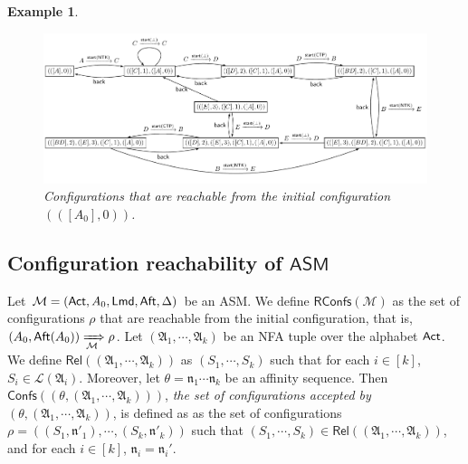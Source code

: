 \documentclass[preprint,12pt]{elsarticle}
\newtheorem{example}{Example}
\newcommand\Mm{{\mathcal{M} }}
\newcommand\act{{\sf Act}}
\newcommand\aft{{\sf Aft}}
\newcommand\lmd{{\sf Lmd}}
\newcommand{\AMASS}{\textsf{ASM}}
\newcommand\confs{{\mathsf{Confs} }}
\newcommand\aname{\mathfrak{n}}
\newcommand\RConfs{\mathsf{RConfs}}
\newcommand\Rel{\mathsf{Rel}}
\newcommand{\STK}{\mathsf{STK}}
\newcommand\Aut{{\mathfrak{A} }}
\newcommand\Lang{{\mathscr{L} }}
\newcommand{\NFA}{\textsf{NFA}}
\begin{document}
{\begin{example}
\begin{figure}[htbp]
			\centering
			\includegraphics[scale = 0.65]{stk-asm-example.pdf}
			\caption{Configurations that are reachable from the initial configuration $(([A_0], 0))$.} %
			\label{stk-asm-example}
\end{figure}
\end{example}
}


\subsection{Configuration reachability of $\AMASS$} \label{sec-conf-reach}

Let $\Mm =(\act, A_0, \lmd, \aft, \Delta)$ be an  {\AMASS}. We define $\RConfs(\Mm)$ as the set of configurations $\rho$ that are reachable from the initial configuration, that is, 
$(A_0, \aft(A_0)) \xRightarrow[\Mm]{} \rho$. 
Let $(\Aut_1,\cdots,\Aut_k)$ be an {\NFA} tuple over the alphabet $\act$. We define $\Rel((\Aut_1, \cdots, \Aut_k))$ as $(S_1, \cdots, S_k)$ such that for each $i \in [k]$, $S_i \in \Lang(\Aut_i)$. Moreover, let $\theta = \aname_1\cdots\aname_k$ be an affinity sequence. Then $\confs((\theta, (\Aut_1,\cdots,\Aut_k)))$, \emph{the set of configurations accepted by $(\theta, (\Aut_1,\cdots,\Aut_k))$}, is defined as as the set of configurations $\rho = ((S_1,\aname'_1),\cdots,(S_k,\aname'_k))$  such that $(S_1, \cdots, S_k) \in \Rel((\Aut_1, \cdots, \Aut_k))$, and for each $i \in [k]$, $\aname_i=\aname_i'$.
%
\end{document}
